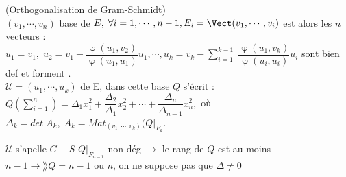 \documentclass[11pt]{article} %
\begin{document}
\theoreme (Orthogonalisation de Gram-Schmidt) \\ $(v_1, \cdots, v_n)$ base de $E, \; \forall i=1, \cdots , n-1, E_i = \Vect(v_1, \cdots , v_i)$ est  alors les $n$ vecteurs : \\ $u_1= v_1, \; u_2 = v_1 - \dfrac{\upvarphi(u_1, v_2)}{\upvarphi(u_1,u_1)}u_1, \cdots , u_k = v_k - \sum_{i=1}^{k-1} \; \dfrac{\upvarphi(u_1, v_k)}{\upvarphi(u_i,u_i)} u_i$ sont bien def et forment . \\ $\mathcal{U} = ( u_1, \cdots , u_k)$ de E, dans cette base $Q$ s'écrit : \\ $Q( \sum_{i=1}^{n}) = \Delta_1 x_{1}^{2} + \dfrac{\Delta_2}{\Delta_1} x_{2}^{2} + \cdots + \dfrac{\Delta_n}{\Delta_{n-1}} x_{n}^{2}   ,$ où $\Delta_k = det \; A_k, \; A_k = Mat_{(v_1, \cdots , v_k)} (Q|_{F_{k}}$.

\commentaire $\mathcal{U} $ s'apelle  $G-S$
\commentaire $Q|_{F_{n-1}}$ non-dég $\longrightarrow$ le rang de $Q$ est au moins $n-1 \longrightarrow \rang Q = n-1$ ou $n$, on ne suppose pas que $\Delta \neq 0$
\end{document}

